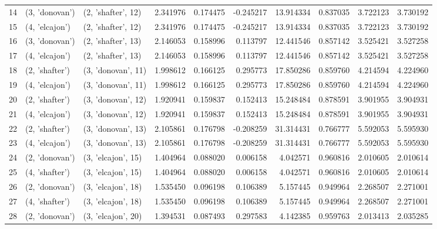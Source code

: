 \begin{tabular}{lllrrrrrrr}
14 &   (3, 'donovan') &  (2, 'shafter', 12) &  2.341976 &   0.174475 & -0.245217 &  13.914334 &  0.837035 &   3.722123 &  3.730192 \\
15 &   (4, 'elcajon') &  (2, 'shafter', 12) &  2.341976 &   0.174475 & -0.245217 &  13.914334 &  0.837035 &   3.722123 &  3.730192 \\
16 &   (3, 'donovan') &  (2, 'shafter', 13) &  2.146053 &   0.158996 &  0.113797 &  12.441546 &  0.857142 &   3.525421 &  3.527258 \\
17 &   (4, 'elcajon') &  (2, 'shafter', 13) &  2.146053 &   0.158996 &  0.113797 &  12.441546 &  0.857142 &   3.525421 &  3.527258 \\
18 &   (2, 'shafter') &  (3, 'donovan', 11) &  1.998612 &   0.166125 &  0.295773 &  17.850286 &  0.859760 &   4.214594 &  4.224960 \\
19 &   (4, 'elcajon') &  (3, 'donovan', 11) &  1.998612 &   0.166125 &  0.295773 &  17.850286 &  0.859760 &   4.214594 &  4.224960 \\
20 &   (2, 'shafter') &  (3, 'donovan', 12) &  1.920941 &   0.159837 &  0.152413 &  15.248484 &  0.878591 &   3.901955 &  3.904931 \\
21 &   (4, 'elcajon') &  (3, 'donovan', 12) &  1.920941 &   0.159837 &  0.152413 &  15.248484 &  0.878591 &   3.901955 &  3.904931 \\
22 &   (2, 'shafter') &  (3, 'donovan', 13) &  2.105861 &   0.176798 & -0.208259 &  31.314431 &  0.766777 &   5.592053 &  5.595930 \\
23 &   (4, 'elcajon') &  (3, 'donovan', 13) &  2.105861 &   0.176798 & -0.208259 &  31.314431 &  0.766777 &   5.592053 &  5.595930 \\
24 &   (2, 'donovan') &  (3, 'elcajon', 15) &  1.404964 &   0.088020 &  0.006158 &   4.042571 &  0.960816 &   2.010605 &  2.010614 \\
25 &   (4, 'shafter') &  (3, 'elcajon', 15) &  1.404964 &   0.088020 &  0.006158 &   4.042571 &  0.960816 &   2.010605 &  2.010614 \\
26 &   (2, 'donovan') &  (3, 'elcajon', 18) &  1.535450 &   0.096198 &  0.106389 &   5.157445 &  0.949964 &   2.268507 &  2.271001 \\
27 &   (4, 'shafter') &  (3, 'elcajon', 18) &  1.535450 &   0.096198 &  0.106389 &   5.157445 &  0.949964 &   2.268507 &  2.271001 \\
28 &   (2, 'donovan') &  (3, 'elcajon', 20) &  1.394531 &   0.087493 &  0.297583 &   4.142385 &  0.959763 &   2.013413 &  2.035285 \\

\end{tabular}
